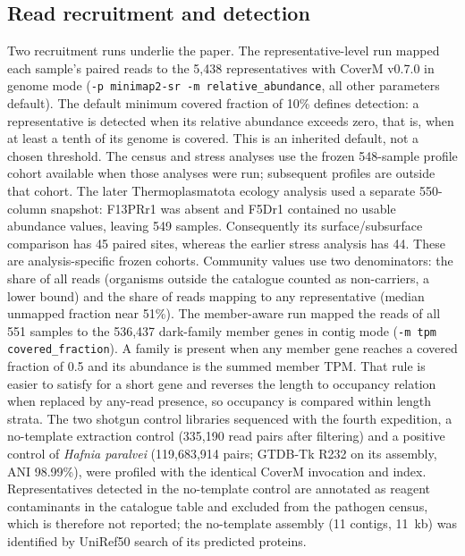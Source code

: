 \documentclass[11pt]{article}
\begin{document}
\subsection*{Read recruitment and detection}
Two recruitment runs underlie the paper. The representative-level run mapped each sample's paired
reads to the 5{,}438 representatives with CoverM v0.7.0 \citep{aroney2025coverm} in genome mode
(\texttt{-p minimap2-sr -m relative\_abundance}, all other parameters default). The default minimum
covered fraction of 10\% defines detection: a representative is detected when its relative abundance
exceeds zero, that is, when at least a tenth of its genome is covered. This is an inherited default,
not a chosen threshold. The census and stress analyses use the frozen 548-sample profile cohort available when those analyses were run; subsequent profiles are outside that cohort. The later Thermoplasmatota ecology analysis used a separate 550-column snapshot: F13PRr1 was absent and F5Dr1 contained no usable abundance values, leaving 549 samples. Consequently its surface/subsurface comparison has 45 paired sites, whereas the earlier stress analysis has 44. These are analysis-specific frozen cohorts. Community values use two denominators: the share of all reads (organisms outside
the catalogue counted as non-carriers, a lower bound) and the share of reads mapping to any
representative (median unmapped fraction near 51\%). The member-aware run mapped the reads of all 551
samples to the 536{,}437 dark-family member genes in contig mode (\texttt{-m tpm covered\_fraction}).
A family is present when any member gene reaches a covered fraction of 0.5 and its abundance is the
summed member TPM. That rule is easier to satisfy for a short gene and reverses the length to
occupancy relation when replaced by any-read presence, so occupancy is compared within length strata.
The two shotgun control libraries sequenced with the fourth expedition, a no-template extraction
control (335{,}190 read pairs after filtering) and a positive control of \emph{Hafnia paralvei}
(119{,}683{,}914 pairs; GTDB-Tk R232 on its assembly, ANI 98.99\%), were profiled with the identical
CoverM invocation and index. Representatives detected in the no-template control are annotated as
reagent contaminants in the catalogue table and excluded from the pathogen census, which is
therefore not reported; the no-template assembly (11 contigs, 11~kb) was identified by UniRef50
search of its predicted proteins.
\end{document}
